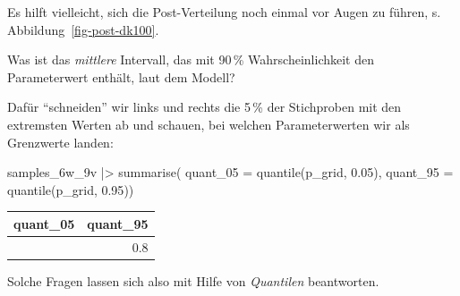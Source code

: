 \documentclass[
  ngerman,
  letterpaper,
  twoside,
  open=any]{scrbook}
\newenvironment{Shaded}{\begin{snugshade}}{\end{snugshade}}
\newcommand{\AttributeTok}[1]{\textcolor[rgb]{0.40,0.45,0.13}{#1}}
\newcommand{\FloatTok}[1]{\textcolor[rgb]{0.68,0.00,0.00}{#1}}
\newcommand{\FunctionTok}[1]{\textcolor[rgb]{0.28,0.35,0.67}{#1}}
\newcommand{\NormalTok}[1]{\textcolor[rgb]{0.00,0.23,0.31}{#1}}
\newcommand{\SpecialCharTok}[1]{\textcolor[rgb]{0.37,0.37,0.37}{#1}}
\newcounter{none} %
\theoremstyle{definition}
\theoremstyle{plain}
\theoremstyle{definition}
\theoremstyle{definition}
\theoremstyle{definition}
\theoremstyle{definition}
\theoremstyle{remark}
\begin{document}
Es hilft vielleicht, sich die Post-Verteilung noch einmal vor Augen zu
führen, s. Abbildung~\ref{fig-post-dk100}.

Was ist das \emph{mittlere} Intervall, das mit 90\,\% Wahrscheinlichkeit
den Parameterwert enthält, laut dem Modell?

Dafür \enquote{schneiden} wir links und rechts die 5\,\% der Stichproben
mit den extremsten Werten ab und schauen, bei welchen Parameterwerten
wir als Grenzwerte landen:

\begin{Shaded}
\begin{Highlighting}[]
\NormalTok{samples\_6w\_9v }\SpecialCharTok{|\textgreater{}} 
  \FunctionTok{summarise}\NormalTok{(}
    \AttributeTok{quant\_05 =} \FunctionTok{quantile}\NormalTok{(p\_grid, }\FloatTok{0.05}\NormalTok{),}
    \AttributeTok{quant\_95 =} \FunctionTok{quantile}\NormalTok{(p\_grid, }\FloatTok{0.95}\NormalTok{))}
\end{Highlighting}
\end{Shaded}

{\def\LTcaptype{none} %
\begin{longtable}[]{@{}rr@{}}
\toprule\noalign{}
quant\_05 & quant\_95 \\
\midrule\noalign{}
\endhead
\bottomrule\noalign{}
\endlastfoot
0.4 & 0.8 \\
\end{longtable}
}

Solche Fragen lassen sich also mit Hilfe von \emph{Quantilen}
beantworten.
\end{document}
